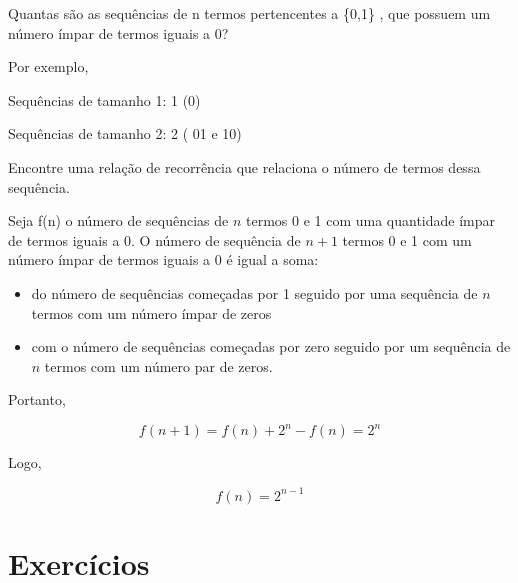 \begin{exemplo}
Quantas são as sequências de n termos pertencentes a \{0,1\} , que possuem um número ímpar de termos iguais a 0?

Por exemplo,

Sequências de tamanho 1: 1 (0) 

Sequências de tamanho 2: 2 ( 01 e 10)

Encontre uma relação de recorrência que relaciona o número de termos dessa sequência.

Seja f(n) o número de sequências de $n$ termos 0 e 1 com uma quantidade ímpar de termos iguais a 0. O número de sequência de $n+1$ termos 0 e 1 com um número ímpar de termos iguais a 0 é igual a soma:
\begin{itemize}
    \item do número de sequências começadas por 1 seguido por uma sequência de $n$ termos com um número ímpar de zeros 
    \item com o número de sequências começadas por zero seguido por um sequência de $n$ termos com um número par de zeros.
\end{itemize}


Portanto,

\begin{equation}
    f(n+1) = f(n) + 2^n - f(n) = 2^n
\end{equation}

Logo,

\begin{equation}
    f(n)  = 2^{n-1}
\end{equation}

\end{exemplo}

\section{Exercícios}



